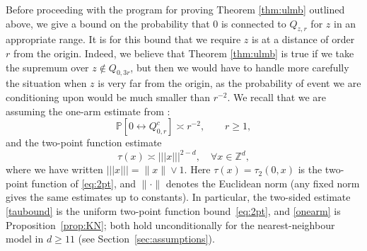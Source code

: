 \documentclass[11pt]{article}
\theoremstyle{definition}
\theoremstyle{remark}
\newcommand{\Z}{\mathbb{Z}}
\newcommand{\bP}{\mathbb{P}}
\numberwithin{equation}{section}
\theoremstyle{plain}
\theoremstyle{definition}
\theoremstyle{remark}
\theoremstyle{plain}
\newcommand{\tnorm}[1]{\vert\!\vert\!\vert #1 \vert\!\vert\!\vert}
\begin{document}
Before proceeding with the program for proving Theorem \ref{thm:ulmb} outlined above, we give a bound on the probability that $0$ is connected to $Q_{z,r}$ for $z$ in an appropriate range. It is for this bound that we require $z$ is at a distance of order $r$
from the origin. Indeed, we believe that Theorem \ref{thm:ulmb} is true if we take the supremum over $z\not\in Q_{0,3r}$, but then we would have to handle more carefully the situation when $z$ is very far from the origin, as the probability of event we are conditioning upon would be much smaller than $r^{-2}$. We recall that we are assuming the one-arm estimate from \cite[Theorem 1]{KN11}:
\begin{equation}\label{onearm}
\bP[0\longleftrightarrow Q_{0,r}^c]\asymp r^{-2},\qquad r\geq 1,
\end{equation}
and the two-point function estimate
\begin{equation}\label{taubound}
\tau(x)\asymp \tnorm{x}^{2-d},\quad \forall x\in\Z^d,
\end{equation}
where we have written $\tnorm{x}=\|x\|\vee1$. Here $\tau(x)=\tau_2(0,x)$ is the two-point function of \eqref{eq:2pt}, and $\|\cdot\|$ denotes the Euclidean norm (any fixed norm gives the same estimates up to constants). In particular, the two-sided estimate \eqref{taubound} is the uniform two-point function bound~\eqref{eq:2pt}, and \eqref{onearm} is Proposition~\ref{prop:KN}; both hold unconditionally for the nearest-neighbour model in $d\ge11$ (see Section~\ref{sec:assumptions}).
\end{document}
